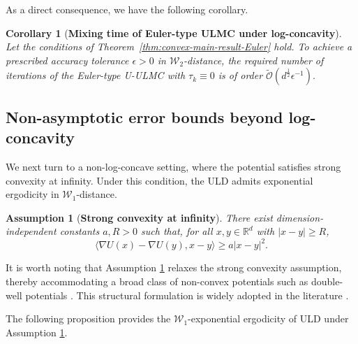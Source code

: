 \documentclass[12pt]{article}
\newenvironment{redtext}
  {\color{black}\ignorespaces}
  {\ignorespacesafterend}
\newenvironment{bluetext}
  {\color{black}\ignorespaces}
  {\ignorespacesafterend}
\numberwithin{equation}{section}
\newtheorem{cor}{Corollary}[section]
\newtheorem{assumption}{Assumption}[section]
\begin{document}
\begin{redtext}
As a direct consequence, we have the following corollary.

\begin{cor}[\textbf{Mixing time of Euler-type ULMC under log-concavity}]
\label{cor:mixing-time-convex-Euler}
Let the conditions of
Theorem~\ref{thm:convex-main-result-Euler} hold.
To achieve a prescribed accuracy tolerance
$\epsilon>0$ in $\mathcal W_2$-distance, the required number of
iterations of the Euler-type U-ULMC  with $\tau_k\equiv0$
is of order
$
\widetilde{\mathcal O}
(
d^{\frac12}\epsilon^{-1}
).
$
\end{cor}


\end{redtext}





\subsection{Non-asymptotic error bounds beyond log-concavity}

We next turn to a non-log-concave setting, where the potential satisfies strong convexity at infinity. 
%
Under this condition, the ULD admits exponential ergodicity in \(\mathcal W_1\)-distance. 
%




\begin{bluetext}



\begin{assumption}[\textbf{Strong convexity at infinity}]
\label{as:convex-at-infinity}
There exist dimension-independent constants \(a,R>0\) such that, for all \(x,y\in\mathbb R^d\) with \(|x-y|\geq R\),
\begin{equation}
\label{eq:convex-outside-ball}
\big\langle
\nabla U(x)-\nabla U(y),
x-y
\big\rangle
\geq
a|x-y|^2 .
\end{equation}
\end{assumption}

It is worth noting that Assumption \ref{as:convex-at-infinity} relaxes the strong convexity assumption, thereby accommodating a broad class of non-convex potentials such as double-well potentials \cite{pang2025projected}. 
This structural formulation is widely adopted in the literature \cite{schuh2024convergence,pang2025projected,mou2022improved}.

The following proposition provides the \(\mathcal W_1\)-exponential ergodicity of ULD under Assumption \ref{as:convex-at-infinity}.

\end{bluetext}
\end{document}
